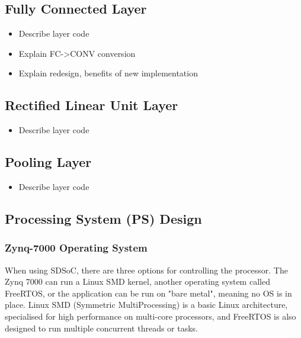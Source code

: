 \documentclass[12pt]{article}
\begin{document}
\subsection{Fully Connected Layer}
\label{sec:Imp-FC}




\begin{itemize}
\item Describe layer code
\item Explain FC->CONV conversion
\item Explain redesign, benefits of new implementation
\end{itemize}

\subsection{Rectified Linear Unit Layer}
\label{sec:Imp-Relu}


\begin{itemize}
\item Describe layer code
\end{itemize}

\subsection{Pooling Layer}
\label{sec:Imp-Pool}


\begin{itemize}
\item Describe layer code
\end{itemize}

\subsection{Processing System (PS) Design}
\label{sec:Design-PS}

\subsubsection{Zynq-7000 Operating System}
\label{sec:Design-PS-OS}

When using SDSoC, there are three options for controlling the processor. The Zynq 7000 can run a Linux SMD kernel, another operating system called FreeRTOS, or the application can be run on "bare metal", meaning no OS is in place. Linux SMD (Symmetric MultiProcessing) is a basic Linux architecture, specialised for high performance on multi-core processors, and FreeRTOS is also designed to run multiple concurrent threads or tasks.
\end{document}
